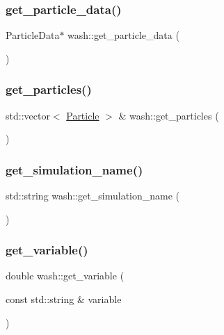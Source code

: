 \subsubsection{\texorpdfstring{get\+\_\+particle\+\_\+data()}{get\_particle\_data()}}
{\footnotesize\ttfamily Particle\+Data$\ast$ wash\+::get\+\_\+particle\+\_\+data (\begin{DoxyParamCaption}{ }\end{DoxyParamCaption})}

\mbox{\label{namespacewash_a79e2901674acaec9da9603ba4fdb12bf}} 
\subsubsection{\texorpdfstring{get\+\_\+particles()}{get\_particles()}}
{\footnotesize\ttfamily std\+::vector$<$ \mbox{\hyperlink{classwash_1_1Particle}{Particle}} $>$ \& wash\+::get\+\_\+particles (\begin{DoxyParamCaption}{ }\end{DoxyParamCaption})}

\mbox{\label{namespacewash_ae53e7d7035c2a890e62ce7687f173222}} 
\subsubsection{\texorpdfstring{get\+\_\+simulation\+\_\+name()}{get\_simulation\_name()}}
{\footnotesize\ttfamily std\+::string wash\+::get\+\_\+simulation\+\_\+name (\begin{DoxyParamCaption}{ }\end{DoxyParamCaption})}

\mbox{\label{namespacewash_a6c61472c6ffa0cb654bc9497292b7f30}} 
\subsubsection{\texorpdfstring{get\+\_\+variable()}{get\_variable()}}
{\footnotesize\ttfamily double wash\+::get\+\_\+variable (\begin{DoxyParamCaption}\item[{const std\+::string \&}]{variable }\end{DoxyParamCaption})}



